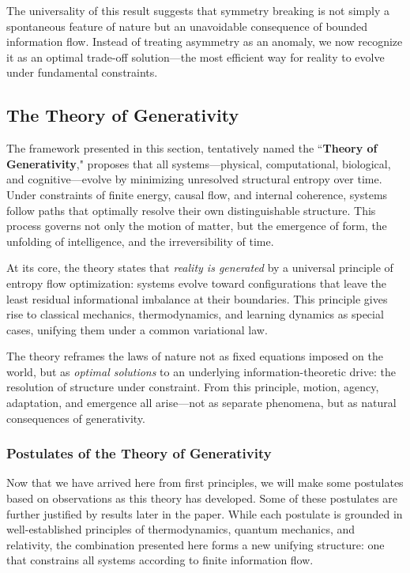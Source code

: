 \documentclass[12pt]{article}
\begin{document}
The universality of this result suggests that symmetry breaking is not simply a spontaneous feature of nature but an unavoidable consequence of bounded information flow. Instead of treating asymmetry as an anomaly, we now recognize it as an optimal trade-off solution—the most efficient way for reality to evolve under fundamental constraints.


\subsection{The Theory of Generativity}

The framework presented in this section, tentatively named the ``\textbf{Theory of Generativity}," proposes that all systems—physical, computational, biological, and cognitive—evolve by minimizing unresolved structural entropy over time. Under constraints of finite energy, causal flow, and internal coherence, systems follow paths that optimally resolve their own distinguishable structure. This process governs not only the motion of matter, but the emergence of form, the unfolding of intelligence, and the irreversibility of time.

At its core, the theory states that \emph{reality is generated} by a universal principle of entropy flow optimization: systems evolve toward configurations that leave the least residual informational imbalance at their boundaries. This principle gives rise to classical mechanics, thermodynamics, and learning dynamics as special cases, unifying them under a common variational law.

The theory reframes the laws of nature not as fixed equations imposed on the world, but as \emph{optimal solutions} to an underlying information-theoretic drive: the resolution of structure under constraint. From this principle, motion, agency, adaptation, and emergence all arise—not as separate phenomena, but as natural consequences of generativity.

\subsubsection{Postulates of the Theory of Generativity}

Now that we have arrived here from first principles, we will make some postulates based on observations as this theory has developed. Some of these postulates are further justified by results later in the paper. While each postulate is grounded in well-established principles of thermodynamics, quantum mechanics, and relativity, the combination presented here forms a new unifying structure: one that constrains all systems according to finite information flow.
\end{document}
